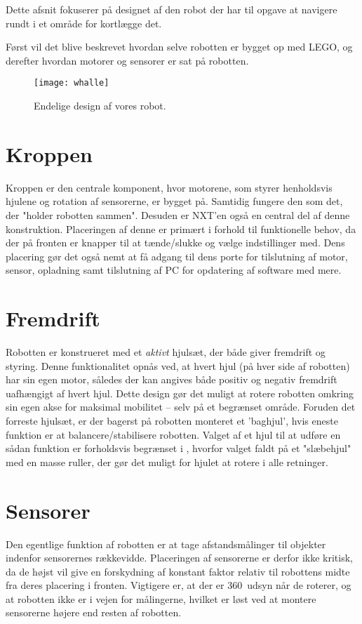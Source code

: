 Dette afsnit fokuserer på designet af den robot der har til opgave at navigere rundt i et område for kortlægge det. 

Først vil det blive beskrevet hvordan selve robotten er bygget op med LEGO, og derefter hvordan motorer og sensorer er sat på robotten.

\begin{figure}
\centering
\texttt{[image: whalle]}
\caption{Endelige design af vores robot.}
\label{robot:opbygning}
\end{figure}




\section{Kroppen}
Kroppen er den centrale komponent, hvor motorene, som styrer henholdsvis hjulene og rotation af sensorerne, er bygget på. 
Samtidig fungere den som det, der "holder robotten sammen".
Desuden er NXT'en også en central del af denne konstruktion.
Placeringen af denne er primært i forhold til funktionelle behov, da der på fronten er knapper til at tænde/slukke og vælge indstillinger med.
Dens placering gør det også nemt at få adgang til dens porte for tilslutning af motor, sensor, opladning samt tilslutning af PC for opdatering af software med mere.

\section{Fremdrift}
Robotten er konstrueret med et \textit{aktivt} hjulsæt, der både giver fremdrift og styring.
Denne funktionalitet opnås ved, at hvert hjul (på hver side af robotten) har sin egen motor, således der kan angives både positiv og negativ fremdrift uafhængigt af hvert hjul.
Dette design gør det muligt at rotere robotten omkring sin egen akse for maksimal mobilitet -- selv på et begrænset område.
Foruden det forreste hjulsæt, er der bagerst på robotten monteret et 'baghjul', hvis eneste funktion er at balancere/stabilisere robotten.
Valget af et hjul til at udføre en sådan funktion er forholdsvis begrænset i \lego, hvorfor valget faldt på et "slæbehjul" med en masse ruller, der gør det muligt for hjulet at rotere i alle retninger.

\section{Sensorer}
Den egentlige funktion af robotten er at tage afstandsmålinger til objekter indenfor sensorernes rækkevidde.
Placeringen af sensorerne er derfor ikke kritisk, da de højst vil give en forskydning af konstant faktor relativ til robottens midte fra deres placering i fronten.
Vigtigere er, at der er 360\degree~udsyn når de roterer, og at robotten ikke er i vejen for målingerne, hvilket er løst ved at montere sensorerne højere end resten af robotten. 

